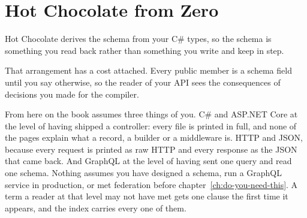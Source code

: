 \chapter{Hot Chocolate from Zero}
\label{ch:hot-chocolate-zero}

Hot Chocolate derives the schema from your C\# types, so the schema is
something you read back rather than something you write and keep in step.

That arrangement has a cost attached. Every public member is a schema field
until you say otherwise, so the reader of your API sees the consequences of
decisions you made for the compiler.

%
From here on the book assumes three things of you. C\# and ASP.NET Core at the
level of having shipped a controller: every file is printed in full, and none
of the pages explain what a record, a builder or a middleware is. HTTP and
JSON, because every request is printed as raw HTTP and every response as the
JSON that came back. And GraphQL at the level of having sent one query and
read one schema. Nothing assumes you have designed a schema, run a GraphQL
service in production, or met federation before
chapter~\ref{ch:do-you-need-this}. A term a reader at that level may not have
met gets one clause the first time it appears, and the index carries every
one of them.







